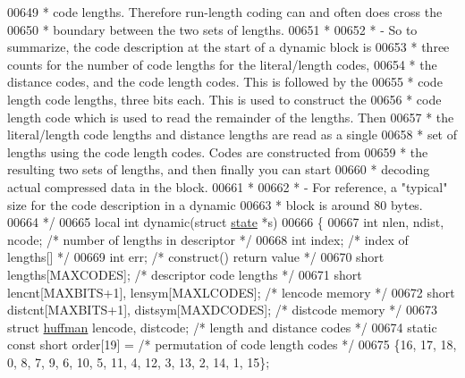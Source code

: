\begin{DoxyCode}
00649 \textcolor{comment}{ *   code lengths.  Therefore run-length coding can and often does cross the}
00650 \textcolor{comment}{ *   boundary between the two sets of lengths.}
00651 \textcolor{comment}{ *}
00652 \textcolor{comment}{ * - So to summarize, the code description at the start of a dynamic block is}
00653 \textcolor{comment}{ *   three counts for the number of code lengths for the literal/length codes,}
00654 \textcolor{comment}{ *   the distance codes, and the code length codes.  This is followed by the}
00655 \textcolor{comment}{ *   code length code lengths, three bits each.  This is used to construct the}
00656 \textcolor{comment}{ *   code length code which is used to read the remainder of the lengths.  Then}
00657 \textcolor{comment}{ *   the literal/length code lengths and distance lengths are read as a single}
00658 \textcolor{comment}{ *   set of lengths using the code length codes.  Codes are constructed from}
00659 \textcolor{comment}{ *   the resulting two sets of lengths, and then finally you can start}
00660 \textcolor{comment}{ *   decoding actual compressed data in the block.}
00661 \textcolor{comment}{ *}
00662 \textcolor{comment}{ * - For reference, a "typical" size for the code description in a dynamic}
00663 \textcolor{comment}{ *   block is around 80 bytes.}
00664 \textcolor{comment}{ */}
00665 local \textcolor{keywordtype}{int} dynamic(\textcolor{keyword}{struct} \hyperlink{structstate}{state} *s)
00666 \{
00667     \textcolor{keywordtype}{int} nlen, ndist, ncode;             \textcolor{comment}{/* number of lengths in descriptor */}
00668     \textcolor{keywordtype}{int} index;                          \textcolor{comment}{/* index of lengths[] */}
00669     \textcolor{keywordtype}{int} err;                            \textcolor{comment}{/* construct() return value */}
00670     \textcolor{keywordtype}{short} lengths[MAXCODES];            \textcolor{comment}{/* descriptor code lengths */}
00671     \textcolor{keywordtype}{short} lencnt[MAXBITS+1], lensym[MAXLCODES];         \textcolor{comment}{/* lencode memory */}
00672     \textcolor{keywordtype}{short} distcnt[MAXBITS+1], distsym[MAXDCODES];       \textcolor{comment}{/* distcode memory */}
00673     \textcolor{keyword}{struct }\hyperlink{structhuffman}{huffman} lencode, distcode;   \textcolor{comment}{/* length and distance codes */}
00674     \textcolor{keyword}{static} \textcolor{keyword}{const} \textcolor{keywordtype}{short} order[19] =      \textcolor{comment}{/* permutation of code length codes */}
00675         \{16, 17, 18, 0, 8, 7, 9, 6, 10, 5, 11, 4, 12, 3, 13, 2, 14, 1, 15\};

\end{DoxyCode}
